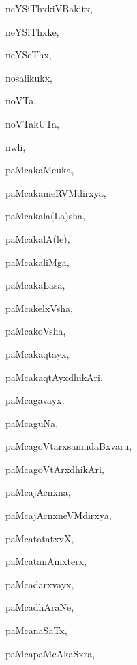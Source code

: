 \begin{multicols}{3}
{\noindent
{neYSiThxkiVBakitx}, \pageref{neYSiThxkiVBakitx}

\noindent
{neYSiThxke}, \pageref{neYSiThxke}

\noindent
{neYSeThx}, \pageref{neYSeThx}

\noindent
{nosalikukx}, \pageref{nosalikukx}

\noindent
{noVTa}, \pageref{noVTa}

\noindent
{noVTakUTa}, \pageref{noVTakUTa}

\noindent
{nwli}, \pageref{nwli}

\noindent
{paMcakaMcuka}, \pageref{paMcakaMcuka}

\noindent
{paMcakameRVMdirxya}, \pageref{paMcakameRVMdirxya}

\noindent
{paMcakala(La)sha}, \pageref{paMcakalaLasha}

\noindent
{paMcakalA(le)}, \pageref{paMcakalAle}

\noindent
{paMcakaliMga}, \pageref{paMcakaliMga}

\noindent
{paMcakaLasa}, \pageref{paMcakaLasa}

\noindent
{paMcakelxVsha}, \pageref{paMcakelxVsha}

\noindent
{paMcakoVsha}, \pageref{paMcakoVsha}

\noindent
{paMcakaqtayx}, \pageref{paMcakaqtayx}

\noindent
{paMcakaqtAyxdhikAri}, \pageref{paMcakaqtAyxdhikAri}

\noindent
{paMcagavayx}, \pageref{paMcagavayx}

\noindent
{paMcaguNa}, \pageref{paMcaguNa}

\noindent
{paMcagoVtarxsamudaBxvaru}, \pageref{paMcagoVtarxsamudaBxvaru}

\noindent
{paMcagoVtArxdhikAri}, \pageref{paMcagoVtArxdhikAri}

\noindent
{paMcajAcnxna}, \pageref{paMcajAcnxna}

\noindent
{paMcajAcnxneVMdirxya}, \pageref{paMcajAcnxneVMdirxya}

\noindent
{paMcatatatxvX}, \pageref{paMcatatatxvX}

\noindent
{paMcatanAmxterx}, \pageref{paMcatanAmxterx}

\noindent
{paMcadarxvayx}, \pageref{paMcadarxvayx}

\noindent
{paMcadhAraNe}, \pageref{paMcadhAraNe}

\noindent
{paMcanaSaTx}, \pageref{paMcanaSaTx}

\noindent
{paMcapaMcAkaSxra}, \pageref{paMcapaMcAkaSxra}

}
\end{multicols}
